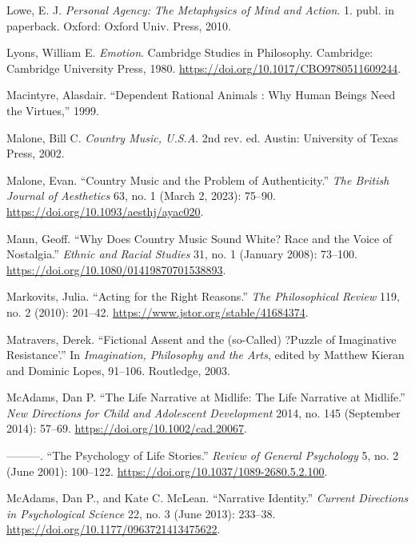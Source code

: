 \documentclass[phdthesis,12pt,final]{wuthesis}
\newlength{\cslhangindent}
\newenvironment{CSLReferences}[2] %
{\begin{list}{}{%
	\setlength{\itemindent}{0pt}
	\setlength{\leftmargin}{0pt}
	\setlength{\parsep}{0pt}
	\ifodd #1
	\setlength{\leftmargin}{\cslhangindent}
	\setlength{\itemindent}{-1\cslhangindent}
	\fi
	\setlength{\itemsep}{#2\baselineskip}}}
{\end{list}}
\theoremstyle{definition}
\theoremstyle{definition}
\theoremstyle{definition}
\theoremstyle{definition}
\theoremstyle{remark}
\begin{document}
\begin{CSLReferences}{1}{0}
Lowe, E. J. \emph{Personal Agency: The Metaphysics of Mind and Action}. 1. publ. in paperback. Oxford: Oxford Univ. Press, 2010.

Lyons, William E. \emph{Emotion}. Cambridge Studies in Philosophy. Cambridge: Cambridge University Press, 1980. \url{https://doi.org/10.1017/CBO9780511609244}.

Macintyre, Alasdair. {``Dependent Rational Animals : Why Human Beings Need the Virtues,''} 1999.

Malone, Bill C. \emph{Country Music, {U}.{S}.{A}}. 2nd rev. ed. Austin: University of Texas Press, 2002.

Malone, Evan. {``Country {Music} and the {Problem} of {Authenticity}.''} \emph{The British Journal of Aesthetics} 63, no. 1 (March 2, 2023): 75--90. \url{https://doi.org/10.1093/aesthj/ayac020}.

Mann, Geoff. {``Why Does Country Music Sound White? {Race} and the Voice of Nostalgia.''} \emph{Ethnic and Racial Studies} 31, no. 1 (January 2008): 73--100. \url{https://doi.org/10.1080/01419870701538893}.

Markovits, Julia. {``Acting for the {Right Reasons}.''} \emph{The Philosophical Review} 119, no. 2 (2010): 201--42. \url{https://www.jstor.org/stable/41684374}.

Matravers, Derek. {``Fictional {Assent} and the (so-{Called}) ?{Puzzle} of {Imaginative Resistance}'.''} In \emph{Imagination, {Philosophy} and the {Arts}}, edited by Matthew Kieran and Dominic Lopes, 91--106. Routledge, 2003.

McAdams, Dan P. {``The {Life Narrative} at {Midlife}: {The Life Narrative} at {Midlife}.''} \emph{New Directions for Child and Adolescent Development} 2014, no. 145 (September 2014): 57--69. \url{https://doi.org/10.1002/cad.20067}.

---------. {``The {Psychology} of {Life Stories}.''} \emph{Review of General Psychology} 5, no. 2 (June 2001): 100--122. \url{https://doi.org/10.1037/1089-2680.5.2.100}.

McAdams, Dan P., and Kate C. McLean. {``Narrative {Identity}.''} \emph{Current Directions in Psychological Science} 22, no. 3 (June 2013): 233--38. \url{https://doi.org/10.1177/0963721413475622}.


\end{CSLReferences}
\end{document}
